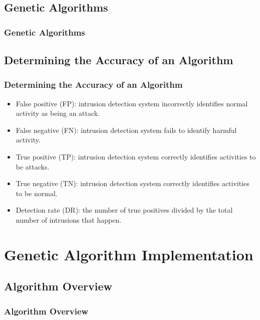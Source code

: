 \documentclass{beamer}
\begin{document}
\subsection{Genetic Algorithms}
\begin{frame}
  \frametitle{Genetic Algorithms}

\end{frame}


\subsection{Determining the Accuracy of an Algorithm}
\begin{frame}
  \frametitle{Determining the Accuracy of an Algorithm}
	\begin{itemize}
		\item False positive (FP): intrusion detection system incorrectly identifies normal activity as being an attack. 
		\item False negative (FN): intrusion detection system fails to identify harmful activity. 
		\item True positive (TP): intrusion detection system correctly identifies activities to be attacks. 
		\item True negative (TN): intrusion detection system correctly
identifies activities to be normal.
		\item Detection rate (DR): the number of true positives divided by the total number of intrusions that happen.
	\end{itemize}
\end{frame}
\section[Genetic Algorithm Implementation]{Genetic Algorithm Implementation}
\subsection{Algorithm Overview}
\begin{frame}
  \frametitle{Algorithm Overview}

\end{frame}
\end{document}
